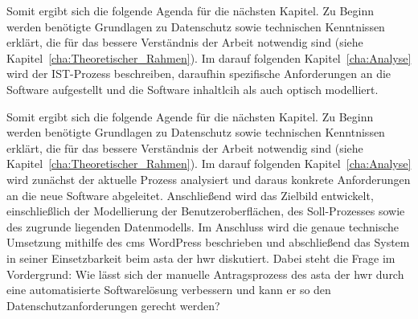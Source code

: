Somit ergibt sich die folgende Agenda für die nächsten Kapitel. Zu Beginn werden benötigte Grundlagen zu Datenschutz sowie technischen Kenntnissen erklärt, die für das bessere Verständnis der Arbeit notwendig sind (siehe Kapitel~\ref{cha:Theoretischer_Rahmen}). Im darauf folgenden Kapitel~\ref{cha:Analyse} wird der IST-Prozess beschreiben, daraufhin spezifische Anforderungen an die Software aufgestellt und die Software inhaltlcih als auch optisch modelliert. 

Somit ergibt sich die folgende Agende für die nächsten Kapitel. Zu Beginn werden benötigte Grundlagen zu Datenschutz sowie technischen Kenntnissen erklärt, die für das bessere Verständnis der Arbeit notwendig sind (siehe Kapitel~\ref{cha:Theoretischer_Rahmen}). Im darauf folgenden Kapitel~\ref{cha:Analyse} wird zunächst der aktuelle Prozess analysiert und daraus konkrete Anforderungen an die neue Software abgeleitet. Anschließend wird das Zielbild entwickelt, einschließlich der Modellierung der Benutzeroberflächen, des Soll-Prozesses sowie des zugrunde liegenden Datenmodells. Im Anschluss wird die genaue technische Umsetzung mithilfe des \gls{cms} WordPress beschrieben und abschließend das System in seiner Einsetzbarkeit beim \gls{asta} der \gls{hwr} diskutiert. Dabei steht die Frage im Vordergrund: \glqq{}Wie lässt sich der manuelle Antragsprozess des \gls{asta} der \gls{hwr} durch eine automatisierte Softwarelösung verbessern und kann er so den Datenschutzanforderungen gerecht werden?\grqq{}
